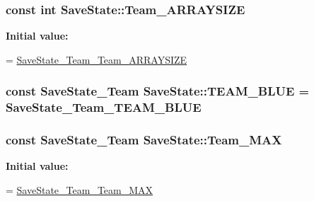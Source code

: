 \hypertarget{class_save_state_a76a00bd36df002f12b227f2cc67378f0}{
\subsubsection[{Team\-\_\-\-A\-R\-R\-A\-Y\-S\-I\-Z\-E}]{\setlength{\rightskip}{0pt plus 5cm}const int Save\-State\-::\-Team\-\_\-\-A\-R\-R\-A\-Y\-S\-I\-Z\-E\hspace{0.3cm}{\ttfamily [static]}}}\label{class_save_state_a76a00bd36df002f12b227f2cc67378f0}
{\bfseries Initial value\-:}
\begin{DoxyCode}
=
    \hyperlink{savestate_8pb_8h_ac9559575096dcdd829a198e7bd7805b9}{SaveState\_Team\_Team\_ARRAYSIZE}
\end{DoxyCode}
\hypertarget{class_save_state_adf1b7a39d63e6e33f3b6d72991c9830a}{
\subsubsection[{T\-E\-A\-M\-\_\-\-B\-L\-U\-E}]{\setlength{\rightskip}{0pt plus 5cm}const {\bf Save\-State\-\_\-\-Team} Save\-State\-::\-T\-E\-A\-M\-\_\-\-B\-L\-U\-E = {\bf Save\-State\-\_\-\-Team\-\_\-\-T\-E\-A\-M\-\_\-\-B\-L\-U\-E}\hspace{0.3cm}{\ttfamily [static]}}}\label{class_save_state_adf1b7a39d63e6e33f3b6d72991c9830a}
\hypertarget{class_save_state_a62f9cfc066b2ab0c830f2bff1a80164a}{
\subsubsection[{Team\-\_\-\-M\-A\-X}]{\setlength{\rightskip}{0pt plus 5cm}const {\bf Save\-State\-\_\-\-Team} Save\-State\-::\-Team\-\_\-\-M\-A\-X\hspace{0.3cm}{\ttfamily [static]}}}\label{class_save_state_a62f9cfc066b2ab0c830f2bff1a80164a}
{\bfseries Initial value\-:}
\begin{DoxyCode}
=
    \hyperlink{savestate_8pb_8h_a39388958e0de6fe69060da0cf8067df3}{SaveState\_Team\_Team\_MAX}
\end{DoxyCode}
